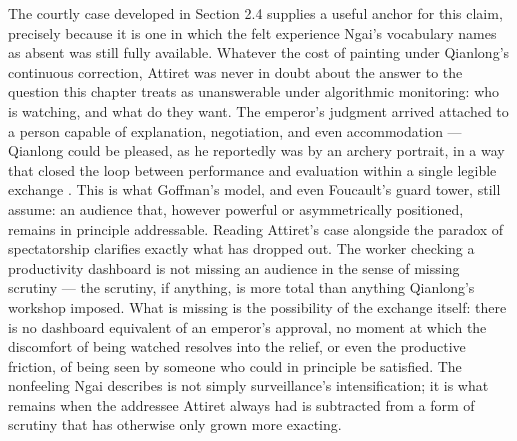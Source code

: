 \documentclass[10pt]{article}
\begin{document}
The courtly case developed in Section 2.4 supplies a useful anchor for this claim, precisely because it is one in which the felt experience Ngai's vocabulary names as absent was still fully available. Whatever the cost of painting under Qianlong's continuous correction, Attiret was never in doubt about the answer to the question this chapter treats as unanswerable under algorithmic monitoring: who is watching, and what do they want. The emperor's judgment arrived attached to a person capable of explanation, negotiation, and even accommodation --- Qianlong could be pleased, as he reportedly was by an archery portrait, in a way that closed the loop between performance and evaluation within a single legible exchange \cite{kleutghen}. This is what Goffman's model, and even Foucault's guard tower, still assume: an audience that, however powerful or asymmetrically positioned, remains in principle addressable. Reading Attiret's case alongside the paradox of spectatorship clarifies exactly what has dropped out. The worker checking a productivity dashboard is not missing an audience in the sense of missing scrutiny --- the scrutiny, if anything, is more total than anything Qianlong's workshop imposed. What is missing is the possibility of the exchange itself: there is no dashboard equivalent of an emperor's approval, no moment at which the discomfort of being watched resolves into the relief, or even the productive friction, of being seen by someone who could in principle be satisfied. The nonfeeling Ngai describes is not simply surveillance's intensification; it is what remains when the addressee Attiret always had is subtracted from a form of scrutiny that has otherwise only grown more exacting.
\end{document}
